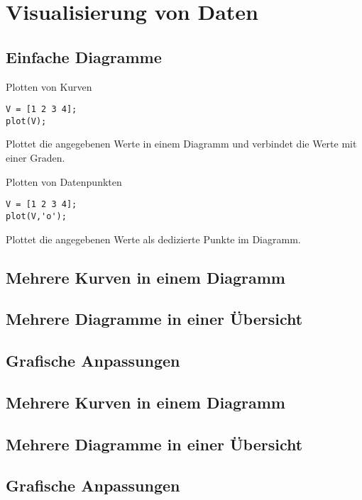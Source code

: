  \section{Visualisierung von Daten}
        \subsection{Einfache Diagramme}
        \begin{CodeErklaerungBox}{Plotten von Kurven}
                \begin{lstlisting}
V = [1 2 3 4];
plot(V);
                \end{lstlisting}
                \tcblower
                Plottet die angegebenen Werte in einem Diagramm und verbindet die Werte mit einer Graden.
                \end{CodeErklaerungBox}
                 \begin{CodeErklaerungBox}{Plotten von Datenpunkten}
                \begin{lstlisting}
V = [1 2 3 4];
plot(V,'o');
                \end{lstlisting}
                \tcblower
                Plottet die angegebenen Werte als dedizierte Punkte im Diagramm.
                \end{CodeErklaerungBox}
        \subsection{Mehrere Kurven in einem Diagramm}
        \subsection{Mehrere Diagramme in einer Übersicht}
        \subsection{Grafische Anpassungen}
        \subsection{Mehrere Kurven in einem Diagramm}
        \subsection{Mehrere Diagramme in einer Übersicht}
        \subsection{Grafische Anpassungen}
       
